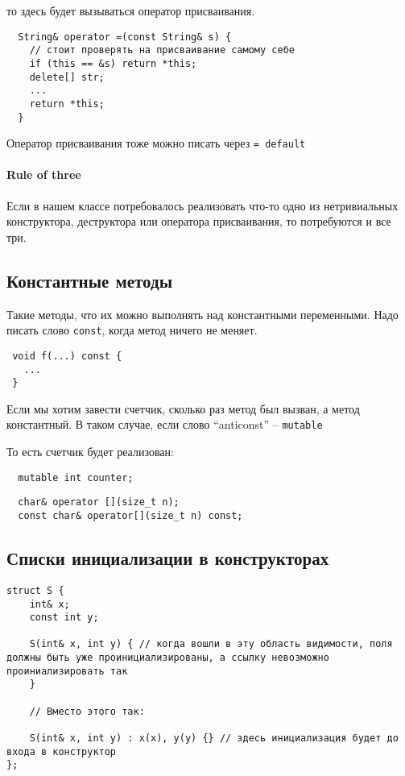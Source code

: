 \documentclass[12pt]{article}
\begin{document}
то здесь будет вызываться оператор присваивания. 

\begin{lstlisting}
  String& operator =(const String& s) {
    // стоит проверять на присваивание самому себе
    if (this == &s) return *this;
    delete[] str;
    ...
    return *this;
  }
\end{lstlisting}
 
 Оператор присваивания тоже можно писать через \texttt{= default}
 
 \paragraph{Rule of three}  Если в нашем классе потребовалось реализовать что-то одно из нетривиальных конструктора, деструктора или оператора присваивания, то потребуются и все три. 
 
 \subsection{Константные методы}
 
 Такие методы, что их можно выполнять над константными переменными. Надо писать слово \texttt{const}, когда метод ничего не меняет.
 
\begin{lstlisting}
 void f(...) const {
   ...
 }
\end{lstlisting} 
 
 Если мы хотим завести счетчик, сколько раз метод был вызван, а метод константный. В таком случае, если слово ``anticonst'' -- \texttt{mutable}
 
 То есть счетчик будет реализован:
 
\begin{lstlisting}
  mutable int counter;
\end{lstlisting}
 
\begin{lstlisting}
  char& operator [](size_t n);
  const char& operator[](size_t n) const;
\end{lstlisting}
 
 \subsection{Списки инициализации в конструкторах}
 
\begin{lstlisting}
struct S {
	int& x;
	const int y;
	
	S(int& x, int y) { // когда вошли в эту область видимости, поля должны быть уже проинициализированы, а ссылку невозможно проиниализировать так
	}
	
	// Вместо этого так:
	
	S(int& x, int y) : x(x), y(y) {} // здесь инициализация будет до входа в конструктор
};
\end{lstlisting}
\end{document}
